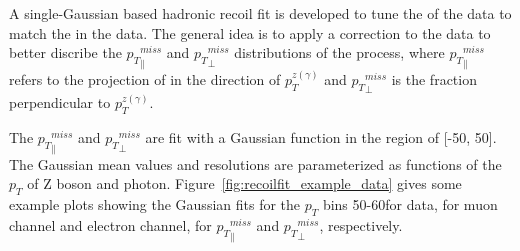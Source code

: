 \vspace{0.3cm}
A single-Gaussian based hadronic recoil fit is developed to tune the \ptmiss of the \gjets data to match the \ptmiss in the \Zjets data. The general idea is to apply a correction to the \gjets data to better discribe the ${p_{T}}^{miss}_\parallel$ and ${p_{T}}^{miss}_\perp$ distributions of the \Zjets process, where ${p_{T}}^{miss}_\parallel$ refers to the projection of \ptmiss in the direction of ${p}_{T}^{z(\gamma)}$ and ${p_{T}}^{miss}_\perp$ is the fraction perpendicular to ${p}_{T}^{z(\gamma)}$. 

\vspace{0.3cm}
The ${p_{T}}^{miss}_\parallel$ and ${p_{T}}^{miss}_\perp$ are fit with a Gaussian function in the region of [-50, 50]\GeV. The Gaussian mean values and resolutions are parameterized as functions of the $p_T$ of Z boson and photon. Figure~\ref{fig:recoilfit_example_data} gives some example plots showing the Gaussian fits for the $p_T$ bins 50-60\GeV for \Zjets data, for muon channel and electron channel, for ${p_{T}}^{miss}_\parallel$ and ${p_{T}}^{miss}_\perp$, respectively.
